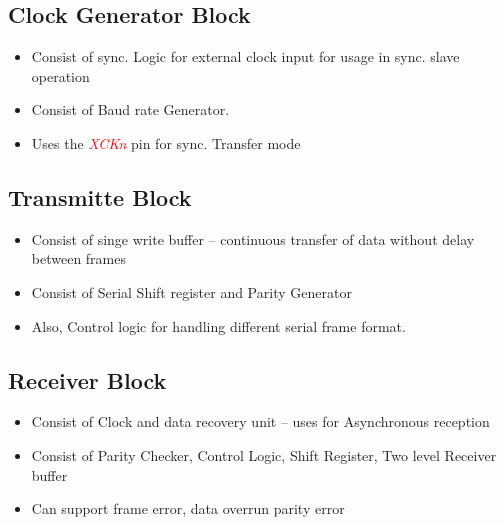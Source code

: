\documentclass{article}
\newcommand{\pinFormat}[1]{\emph{\textcolor{red}{#1}}}
\begin{document}
\subsection{Clock Generator Block}
\begin{itemize}
    \item Consist of sync. Logic for external clock input for usage in sync. slave operation 
    \item Consist of Baud rate Generator.
    \item Uses the \pinFormat{XCKn} pin for sync. Transfer mode
\end{itemize}

\subsection{Transmitte Block}
\begin{itemize}
    \item Consist of singe write buffer – continuous transfer of data without delay between frames
    \item Consist of Serial Shift register and Parity Generator
    \item Also, Control logic for handling different serial frame format.
\end{itemize}

\subsection{Receiver Block}
\begin{itemize}
    \item Consist of Clock and data recovery unit – uses for Asynchronous reception
    \item Consist of Parity Checker, Control Logic, Shift Register, Two level Receiver buffer
    \item Can support frame error, data overrun parity error
\end{itemize}
\end{document}
